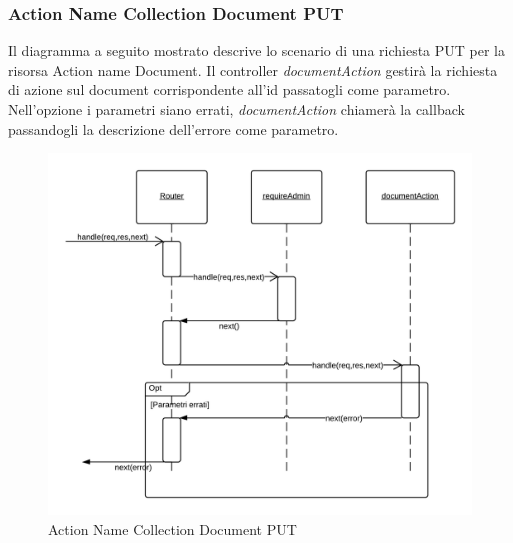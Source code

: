 \subsubsection{Action Name Collection Document PUT}
Il diagramma a seguito mostrato descrive lo scenario di una richiesta PUT per la risorsa Action name Document.
Il controller \emph{documentAction} gestirà la richiesta di azione sul document corrispondente all'id passatogli come parametro.
Nell'opzione i parametri siano errati, \emph{documentAction} chiamerà la callback passandogli la descrizione dell'errore come parametro.
\begin{figure}[H]
	\begin{center} 
		\includegraphics[scale=0.20]{scenari/Action Name Collection Document PUT.png} 
		\caption{Action Name Collection Document PUT}
	\end{center} 
\end{figure}

